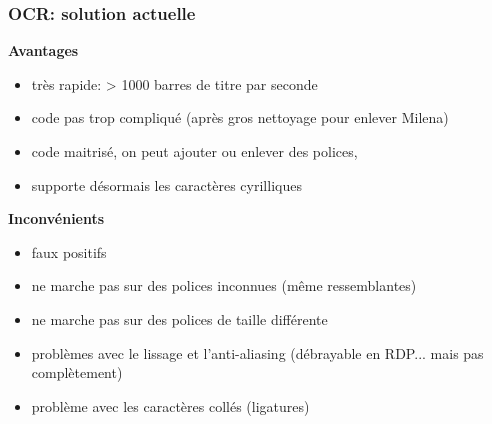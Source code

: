 \documentclass[xcolor=dvipsnames]{beamer}
\begin{document}
\begin{frame}
\frametitle{OCR: solution actuelle}
    \begin{center}\begin{alertblock}{}
            \begin{center}\textbf{\Large Avantages}\end{center}
    \end{alertblock}\end{center}
    \begin{itemize}
    \item très rapide: > 1000 barres de titre par seconde
    \item code pas trop compliqué (après gros nettoyage pour enlever Milena)
    \item code maitrisé, on peut ajouter ou enlever des polices, 
    \item supporte désormais les caractères cyrilliques
    \end{itemize}
    \begin{center}\begin{alertblock}{}
            \begin{center}\textbf{\Large Inconvénients}\end{center}
    \end{alertblock}\end{center}
    \begin{itemize}
    \item faux positifs
    \item ne marche pas sur des polices inconnues (même ressemblantes)
    \item ne marche pas sur des polices de taille différente
    \item problèmes avec le lissage et l'anti-aliasing (débrayable en RDP... mais pas complètement)
    \item problème avec les caractères collés (ligatures)
    \end{itemize}
\end{frame}
\end{document}
